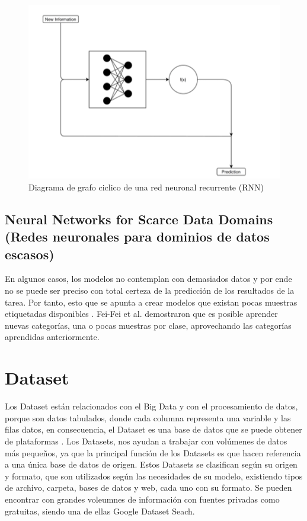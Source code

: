 \begin{figure}[h]
\centering
\includegraphics[scale=0.8]{img/Marco Teorico/rnn.PNG}  
\caption{Diagrama de grafo ciclico de una red neuronal recurrente (RNN) }
\end{figure}

\doublespacing
\subsection{Neural Networks for Scarce Data Domains  (Redes neuronales para dominios de datos escasos)}
En algunos casos, los modelos no contemplan con demasiados datos y por ende no se puede ser preciso con total certeza de la predicción de los resultados de la tarea. Por tanto, esto que se apunta a crear modelos que existan pocas muestras etiquetadas disponibles \cite{Carola}. Fei-Fei et al. \cite{Fei-Fei2006} demostraron que es posible aprender nuevas categorías, una o pocas muestras por clase, aprovechando las categorías aprendidas anteriormente. \\

\doublespacing
\section{Dataset}
\par Los Dataset están relacionados con el Big Data y con el procesamiento de datos, porque son datos tabulados, donde cada columna representa una variable y las filas datos, en consecuencia, el Dataset es una base de datos que se puede obtener de plataformas \cite{Astudillo2021}. Los Datasets, nos ayudan a trabajar con volúmenes de datos más pequeños, ya que la principal función de los Datasets es que hacen referencia a una única base de datos de origen. Estos Datasets se clasifican según su origen y formato, que son utilizados según las necesidades de su modelo, existiendo tipos de archivo, carpeta, bases de datos y web, cada uno con su formato. Se pueden encontrar con grandes voleumnes de información con fuentes privadas como gratuitas, siendo una de ellas Google Dataset Seach.\\


